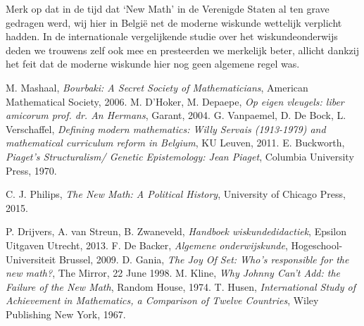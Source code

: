 \documentclass[a4paper,11pt]{article}
\begin{document}
\noindent Merk op dat in de tijd dat `New Math' in de Verenigde Staten al ten 
grave gedragen werd, wij hier in België net de moderne wiskunde wettelijk 
verplicht hadden. In de internationale vergelijkende studie over het 
wiskundeonderwijs deden we trouwens zelf ook mee en presteerden we merkelijk 
beter, allicht dankzij het feit dat de moderne wiskunde hier nog geen algemene 
regel was.

\newpage
\begin{thebibliography}{99}
 M. Mashaal, \emph{Bourbaki: A Secret Society of Mathematicians}, American Mathematical Society, 2006.
 M. D'Hoker, M. Depaepe, \emph{Op eigen vleugels: liber amicorum prof. dr. An Hermans},  
Garant, 2004.
 G. Vanpaemel, D. De Bock, L. Verschaffel, \emph{Defining modern mathematics: Willy Servais (1913-1979) and mathematical curriculum reform in Belgium}, KU Leuven, 2011.
 E. Buckworth, \emph{Piaget's Structuralism/ Genetic Epistemology: Jean Piaget}, Columbia University Press, 1970.

 C. J. Philips, \emph{The New Math: A Political History}, University  of Chicago Press, 2015.

  P. Drijvers, A. van Streun, B. Zwaneveld, \emph{Handboek 
 wiskundedidactiek}, Epsilon Uitgaven Utrecht, 2013.
  F. De Backer, \emph{Algemene onderwijskunde}, Hogeschool-Universiteit 
 Brussel, 2009.
 D. Gania, \emph{The Joy Of Set: Who's responsible for the new 
math?}, The Mirror, 22 June 1998.
 M. Kline, \emph{Why Johnny Can't Add: the Failure of the New Math}, 
Random House, 1974.
 T. Husen, \emph{International Study of Achievement in Mathematics, a Comparison of Twelve 
Countries}, Wiley Publishing New York, 1967.
     \end{thebibliography}
\end{document}
